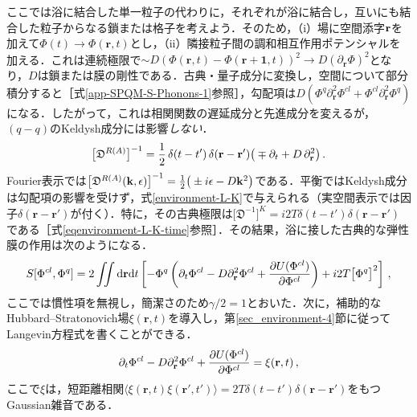 \documentclass[a4paper,11pt]{ltjsarticle}
\def\d{\mathrm{d}}
\begin{document}
ここでは浴に結合した単一粒子の代わりに，それぞれが浴に結合し，互いにも結合した粒子からなる鎖または格子を考えよう．そのため，（i）場に空間添字${\bf r}$を加えて$\Phi(t)\to \Phi(\mathbf{r},t)$とし，（ii）隣接粒子間の調和相互作用ポテンシャルを加える．これは連続極限で$\sim D(\Phi(\mathbf{r},t)-\Phi(\mathbf{r}
+\mathbf{1},t))^2\to D(\partial_\mathbf{r}\Phi)^2$となり，$D$は鎖または膜の剛性である．古典・量子成分に変換し，空間について部分積分すると［式\eqref{app-SPQM-S-Phonons-1}参照］，勾配項は$D\left(\Phi^q\partial^2_\mathbf{r}\Phi^{cl} +
\Phi^{cl}\partial^2_\mathbf{r}\Phi^{q}\right)$になる．したがって，これは相関関数の遅延成分と先進成分を変えるが，$(q-q)$のKeldysh成分には影響\emph{しない}．
\begin{equation}
\big[\mathfrak{D}^{R(A)}\big]^{-1}={1\over 2}\,
\delta(t-t')\,\delta(\mathbf{r}-\mathbf{r}')\big( \mp
\partial_{t} + D\,\partial^2_{\mathbf{r}} \big)\, .
\end{equation}Fourier表示では$\big[\mathfrak{D}^{R(A)}(\mathbf{k},\epsilon)\big]^{-1}={1\over 2}
\big(\pm i\epsilon -D\mathbf{k}^2\big)$である．平衡ではKeldysh成分は勾配項の影響を受けず，式\eqref{environment-L-K}で与えられる（実空間表示では因子$\delta(\mathbf{r}-\mathbf{r}')$が付く）．特に，その古典極限は$\big[\mathfrak{D}^{-1}\big]^K=i2T\delta(t-t')\delta(\mathbf{r}-\mathbf{r}')$である［式\eqref{eqenvironment-L-K-time}参照］．その結果，浴に接した古典的な弾性膜の作用は次のようになる．
\begin{equation}\label{environment-S-chain}
S[\Phi^{cl},\Phi^{q}]=2\iint\d\mathbf{r}\d t\left[-\Phi^q
\left(\partial_t \Phi^{cl}-D\partial^2_\mathbf{r}\Phi^{cl}+{\partial
U(\Phi^{cl})\over
\partial \Phi^{cl} }\right)+i2T\big[\Phi^{q}\big]^2\right]\,,
\end{equation}ここでは慣性項を無視し，簡潔さのため$\gamma/2=1$とおいた．次に，補助的なHubbard--Stratonovich場$\xi(\mathbf{r},t)$を導入し，第\ref{sec_environment-4}節に従ってLangevin方程式を書くことができる．
\begin{equation}
\partial_{t}\Phi^{cl} -D\partial^2_\mathbf{r}\Phi^{cl}+{\partial U(\Phi^{cl})\over
\partial \Phi^{cl} } =\xi(\mathbf{r},t)\, ,
\end{equation}ここで$\xi$は，短距離相関$\langle
\xi(\mathbf{r},t)\xi(\mathbf{r}',t')\rangle=2T\delta(t-t')
\delta(\mathbf{r}-\mathbf{r}')$をもつGaussian雑音である．
\end{document}
